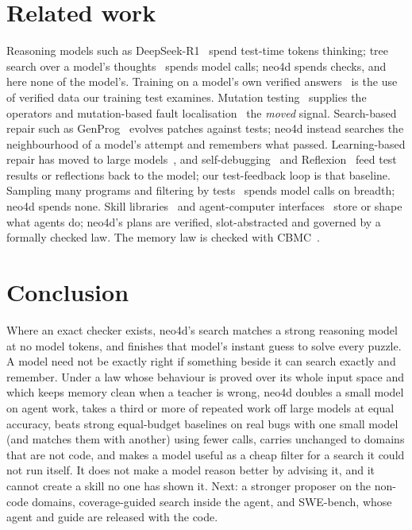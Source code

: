 \documentclass[10pt]{article}
\begin{document}
\section{Related work}
Reasoning models such as DeepSeek-R1~\cite{deepseekr1} spend test-time tokens thinking; tree search over a
model's thoughts~\cite{tot} spends model calls; neo4d spends checks, and here none of the model's. Training on a
model's own verified answers~\cite{star,rest} is the use of verified data our training test examines.
Mutation testing~\cite{demillo1978,jia2011} supplies the operators and mutation-based fault
localisation~\cite{metallaxis} the \emph{moved} signal. Search-based repair such as GenProg~\cite{genprog} evolves
patches against tests; neo4d instead searches the neighbourhood of a model's attempt and remembers what passed.
Learning-based repair has moved to large models~\cite{xia2023,fan2023}, and self-debugging~\cite{chen2024} and
Reflexion~\cite{reflexion} feed test results or reflections back to the model; our test-feedback loop is that
baseline. Sampling many programs and filtering by tests~\cite{alphacode} spends model calls on breadth; neo4d spends
none. Skill libraries~\cite{voyager} and agent-computer interfaces~\cite{sweagent} store or shape what agents do;
neo4d's plans are verified, slot-abstracted and governed by a formally checked law. The memory law is checked with
CBMC~\cite{cbmc}.

\section{Conclusion}
Where an exact checker exists, neo4d's search matches a strong reasoning model at no model tokens, and finishes that
model's instant guess to solve every puzzle. A model need not be exactly right if something beside it can search exactly and remember. Under a law whose
behaviour is proved over its whole input space and which keeps memory clean when a teacher is wrong, neo4d doubles a
small model on agent work, takes a third or more of repeated work off large models at equal accuracy, beats strong
equal-budget baselines on real bugs with one small model (and matches them with another) using fewer calls, carries
unchanged to domains that are not code, and makes a model useful as a cheap filter for a search it could not run
itself. It does not make a model reason better by advising it, and it cannot create a skill no one has shown it. Next: a stronger proposer on the non-code domains, coverage-guided search inside the agent, and SWE-bench, whose agent and guide are released with the code.
\end{document}
